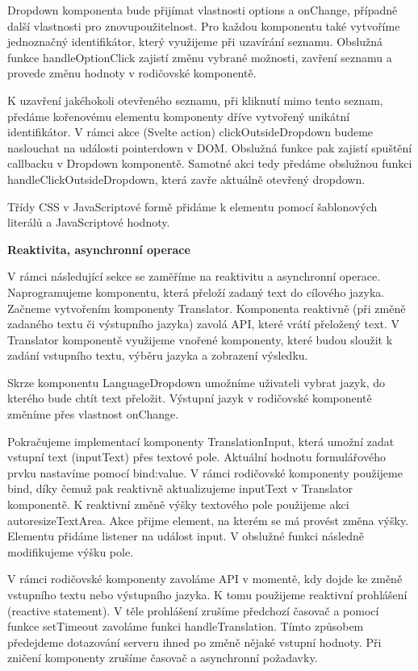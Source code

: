 Dropdown komponenta bude přijímat vlastnosti options a onChange, případně další vlastnosti pro znovupoužitelnost. Pro každou komponentu také vytvoříme jednoznačný identifikátor, který využijeme při uzavírání seznamu.
Obslužná funkce handleOptionClick zajistí změnu vybrané možnosti, zavření seznamu a provede změnu hodnoty v rodičovské komponentě. 

K uzavření jakéhokoli otevřeného seznamu, při kliknutí mimo tento seznam, předáme kořenovému elementu komponenty dříve vytvořený unikátní identifikátor.
V rámci akce (Svelte action) clickOutsideDropdown budeme naslouchat na události pointerdown v DOM. Obslužná funkce pak zajistí spuštění callbacku v Dropdown komponentě. 
Samotné akci tedy předáme obslužnou funkci handleClickOutsideDropdown, která zavře aktuálně otevřený dropdown.

Třídy CSS v JavaScriptové formě přidáme k elementu pomocí šablonových literálů a JavaScriptové hodnoty.

\begin{flushleft}
  \textbf{Reaktivita, asynchronní operace}
\end{flushleft}

V rámci následující sekce se zaměříme na reaktivitu a asynchronní operace. Naprogramujeme komponentu, která přeloží zadaný text do cílového jazyka. 
Začneme vytvořením komponenty Translator. Komponenta reaktivně (při změně zadaného textu či výstupního jazyka) zavolá API, které vrátí přeložený text. 
V Translator komponentě využijeme vnořené komponenty, které budou sloužit k zadání vstupního textu, výběru jazyka a zobrazení výsledku.

Skrze komponentu LanguageDropdown umožníme uživateli vybrat jazyk, do kterého bude chtít text přeložit. Výstupní jazyk v rodičovské komponentě změníme přes vlastnost onChange.

Pokračujeme implementací komponenty TranslationInput, která umožní zadat vstupní text (inputText) přes textové pole. Aktuální hodnotu formulářového prvku nastavíme pomocí bind:value. 
V rámci rodičovské komponenty použijeme bind, díky čemuž pak reaktivně aktualizujeme inputText v Translator komponentě. K reaktivní změně výšky textového pole použijeme akci autoresizeTextArea. 
Akce přijme element, na kterém se má provést změna výšky. Elementu přidáme listener na událost input. V obslužné funkci následně modifikujeme výšku pole.

V rámci rodičovské komponenty zavoláme API v momentě, kdy dojde ke změně vstupního textu nebo výstupního jazyka. K tomu použijeme reaktivní prohlášení (reactive statement). 
V těle prohlášení zrušíme předchozí časovač a pomocí funkce setTimeout zavoláme funkci handleTranslation. Tímto způsobem předejdeme dotazování serveru ihned po změně nějaké vstupní hodnoty. 
Při zničení komponenty zrušíme časovač a asynchronní požadavky.

